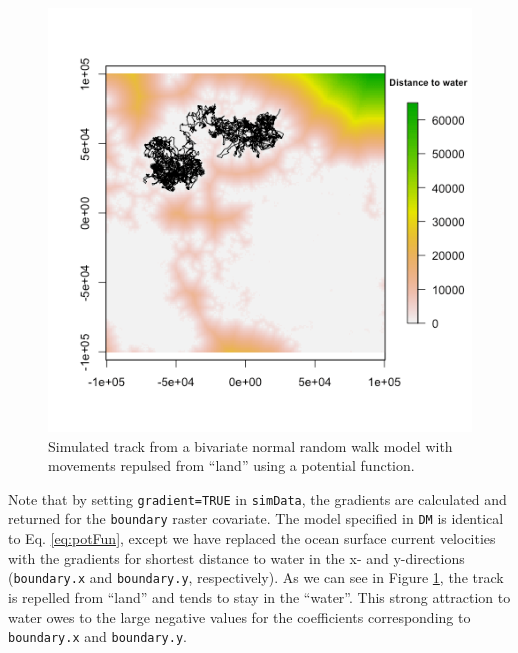 \documentclass[12pt]{article}\usepackage[]{graphicx}\usepackage[]{xcolor}
\begin{document}
\begin{figure}[htbp]
  \centering
  \includegraphics[width=\textwidth]{plot_landConstraintExample.png}
  \caption{Simulated track from a bivariate normal random walk model with movements repulsed from ``land'' using a potential function.}
  \label{fig:landConstraint}
\end{figure}
Note that by setting \verb|gradient=TRUE| in \verb|simData|, the gradients are calculated and returned for the \verb|boundary| raster covariate. The model specified in \verb|DM| is identical to Eq. \ref{eq:potFun}, except we have replaced the ocean surface current velocities with the gradients for shortest distance to water in the x- and y-directions (\verb|boundary.x| and \verb|boundary.y|, respectively). As we can see in Figure \ref{fig:landConstraint}, the track is repelled from ``land'' and tends to stay in the ``water''. This strong attraction to water owes to the large negative values for the coefficients corresponding to \verb|boundary.x| and \verb|boundary.y|. 
\end{document}
